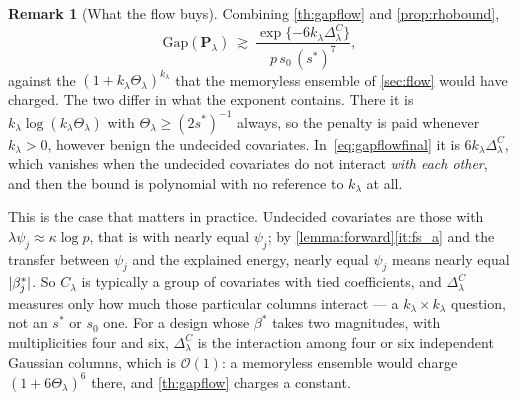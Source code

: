 \documentclass[aos]{imsart}
\DeclarePairedDelimiter{\abs}{\lvert}{\rvert}
\theoremstyle{plain}
\theoremstyle{definition}
\newtheorem{remark}{Remark}[section]
\begin{document}
    \begin{remark}[What the flow buys]
        \label{rem:flowbuys}
        Combining \cref{th:gapflow} and \cref{prop:rhobound},
        \begin{equation}
            \label{eq:gapflowfinal}
            \mathrm{Gap}(\mathbf{P}_\lambda)\ \gtrsim\
            \frac{\exp\{-6k_\lambda\Delta^{C}_\lambda\}}
            {p\,s_0\,(s^{\ast})^{7}} ,
        \end{equation}
        against the $(1+k_\lambda\Theta_\lambda)^{k_\lambda}$ that the
        memoryless ensemble of \cref{sec:flow} would have charged. The two
        differ in what the exponent contains. There it is
        $k_\lambda\log(k_\lambda\Theta_\lambda)$ with
        $\Theta_\lambda\geq(2s^{\ast})^{-1}$ always, so the penalty is paid
        whenever $k_\lambda>0$, however benign the undecided covariates.
        In~\eqref{eq:gapflowfinal} it is $6k_\lambda\Delta^{C}_\lambda$, which
        vanishes when the undecided covariates do not interact
        \emph{with each other}, and then the bound is polynomial with no
        reference to $k_\lambda$ at all.

        This is the case that matters in practice. Undecided covariates are
        those with $\lambda\psi_j\approx\kappa\log p$, that is with nearly
        equal $\psi_j$; by \cref{lemma:forward}\ref{it:fs_a} and the
        transfer between $\psi_j$ and the explained energy, nearly equal
        $\psi_j$ means nearly equal $\abs{\beta^{\ast}_j}$. So $C_\lambda$ is
        typically a group of covariates with tied coefficients, and
        $\Delta^{C}_\lambda$ measures only how much those particular columns
        interact --- a $k_\lambda\times k_\lambda$ question, not an $s^{\ast}$
        or $s_0$ one. For a design whose $\beta^{\ast}$ takes two magnitudes,
        with multiplicities four and six,
        $\Delta^{C}_\lambda$ is the interaction among four or six independent
        Gaussian columns, which is $\mathcal{O}(1)$: a memoryless ensemble
        would charge $(1+6\Theta_\lambda)^{6}$ there, and \cref{th:gapflow}
        charges a constant.
    \end{remark}

    
    
    \appendix
    
\end{document}
